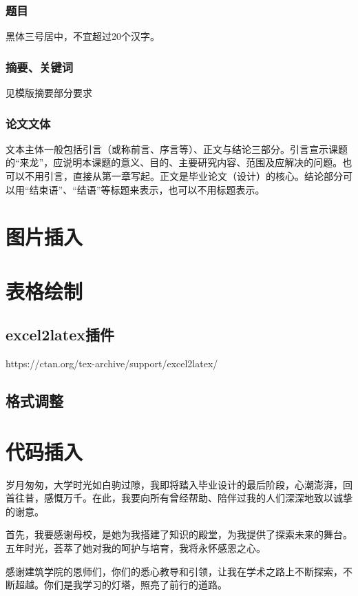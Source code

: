 \documentclass[AutoFakeBold]{ZafuThesis}
\begin{document}
\subsubsection{题目}
黑体三号居中，不宜超过20个汉字。
\subsubsection{摘要、关键词}
见模版摘要部分要求
\subsubsection{论文文体}
文本主体一般包括引言（或称前言、序言等）、正文与结论三部分。引言宣示课题的“来龙”，应说明本课题的意义、目的、主要研究内容、范围及应解决的问题。也可以不用引言，直接从第一章写起。正文是毕业论文（设计）的核心。结论部分可以用“结束语”、“结语”等标题来表示，也可以不用标题表示。\par



\section{图片插入}
\section{表格绘制}
\subsection{excel2latex插件}
https://ctan.org/tex-archive/support/excel2latex/
\subsection{格式调整}


\section{代码插入 }


% 
% 
\Thanks
{
  岁月匆匆，大学时光如白驹过隙，我即将踏入毕业设计的最后阶段，心潮澎湃，回首往昔，感慨万千。在此，我要向所有曾经帮助、陪伴过我的人们深深地致以诚挚的谢意。\par
  首先，我要感谢母校，是她为我搭建了知识的殿堂，为我提供了探索未来的舞台。五年时光，荟萃了她对我的呵护与培育，我将永怀感恩之心。\par
  感谢建筑学院的恩师们，你们的悉心教导和引领，让我在学术之路上不断探索，不断超越。你们是我学习的灯塔，照亮了前行的道路。
}
\end{document}

